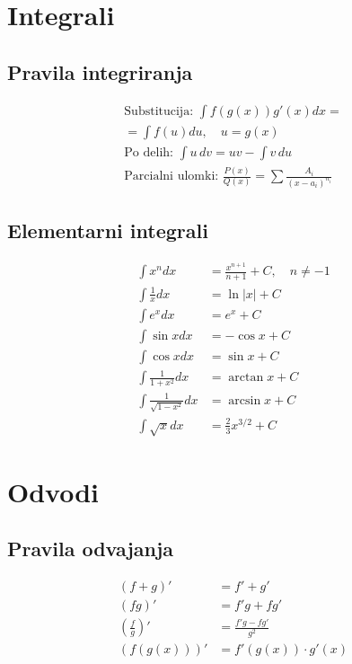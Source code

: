 \documentclass[a4paper,fleqn]{article} %
\begin{document}
\newpage

\section*{\small Integrali}

\subsection*{\footnotesize Pravila integriranja}
\begin{gather*}
\text{Substitucija: } \int f(g(x))g'(x) dx = \\ = \int f(u) du, \quad u = g(x)\\
\text{Po delih: } \int u \, dv = uv - \int v \, du\\
\text{Parcialni ulomki: } \frac{P(x)}{Q(x)} = \sum \frac{A_i}{(x-a_i)^{n_i}}
\end{gather*}

\subsection*{\footnotesize Elementarni integrali}
\begin{align*}
\int x^n dx &= \frac{x^{n+1}}{n+1} + C, \quad n \neq -1\\
\int \frac{1}{x} dx &= \ln|x| + C\\
\int e^x dx &= e^x + C\\
\int \sin x dx &= -\cos x + C\\
\int \cos x dx &= \sin x + C\\
\int \frac{1}{1+x^2} dx &= \arctan x + C\\
\int \frac{1}{\sqrt{1-x^2}} dx &= \arcsin x + C \\
\int \sqrt{x} dx &= \frac{2}{3} x^{3/2} + C 
\end{align*}

\section*{\small Odvodi}

\subsection*{\footnotesize Pravila odvajanja}
\begin{align*}
(f + g)' &= f' + g'\\
(fg)' &= f'g + fg'\\
\left(\frac{f}{g}\right)' &= \frac{f'g - fg'}{g^2}\\
(f(g(x)))' &= f'(g(x)) \cdot g'(x)
\end{align*}
\end{document}

